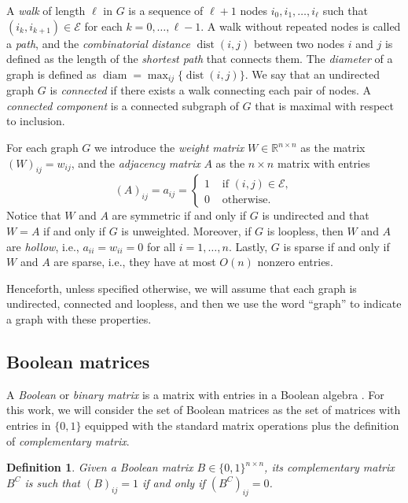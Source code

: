\documentclass[a4paper,12pt]{article}
\newtheorem{definition}{Definition}
\DeclareMathOperator{\diam}{diam}
\DeclareMathOperator{\dist}{dist}
\newcommand{\R}{\mathbb{R}}
\newcommand{\cE}{\mathcal{E}}
\begin{document}
A \emph{walk} of length $\ell$ in $G$ is a sequence of $\ell +1 $ nodes $i_0,i_1,\dots,i_\ell$ such that $(i_k,i_{k+1})\in\cE$ for each $k=0,\dots,\ell-1$.  A walk without repeated nodes is called a \emph{path}, and the \emph{combinatorial distance} $\dist(i,j)$ between two nodes $i$ and $j$ is defined as the length of the \emph{shortest path} that connects them. The \emph{diameter} of a graph is defined as $\diam=\max_{ij}\{ \dist(i,j)\}.$
We say that an undirected graph $G$ is \emph{connected} if there exists a walk connecting each pair of nodes. A \emph{connected component} is a connected subgraph of $G$ that is maximal with respect to inclusion.

For each graph $G$ we introduce the \emph{weight matrix} $W\in \R^{n \times n}$ as the matrix $(W)_{ij} = w_{ij}$, and the \emph{adjacency matrix} $A$ as the $n \times n$ matrix with entries
\begin{equation*}
(A)_{ij} = a_{ij}= 
    \begin{cases}
        1 & \text{ if } (i,j)\in \cE, \\
        0 & \text{ otherwise. }
    \end{cases}
\end{equation*}
Notice that $W$ and $A$ are symmetric if and only if $G$ is undirected and that $W = A$ if and only if $G$ is unweighted. Moreover, if $G$ is loopless, then $W$ and $A$ are \emph{hollow}, i.e., $a_{ii}=w_{ii}=0$ for all $i=1,\dots,n$. Lastly, $G$ is sparse if and only if $W$ and $A$ are sparse, i.e., they have at most $O(n)$ nonzero entries.

Henceforth, unless specified otherwise, we will assume that each graph is undirected, connected and loopless, and then we use the word ``graph'' to indicate a graph with these properties. 

\subsection{Boolean matrices} \label{subsec:lin_algebra}

A \emph{Boolean} or \emph{binary matrix} is a matrix with entries in a Boolean algebra \cite[Section 1.2]{kim_boolean_1982}. For this work, we will consider the set of Boolean matrices as the set of matrices with entries in $\{0,1\}$ equipped with the standard matrix operations plus the definition of \emph{complementary matrix}.
\begin{definition}
Given a Boolean matrix $B\in \{0,1\}^{n \times n}$, its complementary matrix $B^{C}$ is such that $(B)_{ij}=1$ if and only if $(B^C)_{ij}=0$.  
\end{definition}
\end{document}
